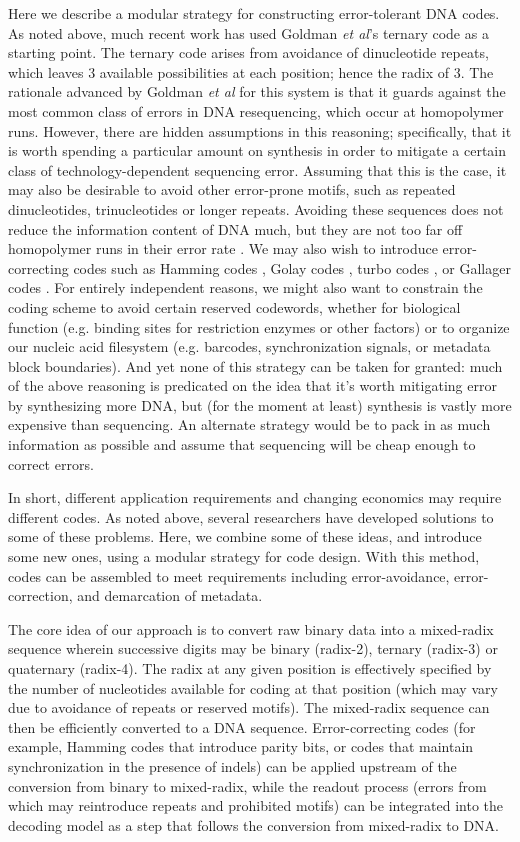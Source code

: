 \documentclass[english]{article}
\begin{document}
Here we describe a modular strategy for constructing error-tolerant DNA codes.
As noted above, much recent work has used Goldman {\em et al}'s ternary code as a starting point.
The ternary code arises from avoidance of dinucleotide repeats, which leaves 3 available possibilities at each position; hence the radix of 3.
The rationale advanced by Goldman {\em et al} for this system is that it guards against the most common class of errors in DNA resequencing, which occur at homopolymer runs.
However, there are hidden assumptions in this reasoning; specifically, that it is worth spending a particular amount on synthesis
in order to mitigate a certain class of technology-dependent sequencing error.
Assuming that this is the case, it may also be desirable to avoid other error-prone motifs, such as repeated dinucleotides, trinucleotides or longer repeats.
Avoiding these sequences does not reduce the information content of DNA much, but they are not too far off homopolymer runs in their error rate \cite{LaehnemannEtAl2016}.
We may also wish to introduce error-correcting codes such as Hamming codes \cite{Mackay2003}, Golay codes \cite{GuptaEtAl2015},
turbo codes \cite{FreyMackay98,MurphyEtAl1999}, or Gallager codes \cite{Mackay1997}.
For entirely independent reasons, we might also want to constrain the coding scheme to avoid certain reserved codewords,
whether for biological function (e.g. binding sites for restriction enzymes or other factors)
or to organize our nucleic acid filesystem (e.g. barcodes, synchronization signals, or metadata block boundaries).
And yet none of this strategy can be taken for granted:
much of the above reasoning is predicated on the idea that it's worth mitigating error by synthesizing more DNA,
but (for the moment at least) synthesis is vastly more expensive than sequencing.
An alternate strategy would be to pack in as much information as possible and assume that sequencing will be cheap enough to correct errors.

In short, different application requirements and changing economics may require different codes.
As noted above, several researchers have developed solutions to some of these problems.
Here, we combine some of these ideas, and introduce some new ones, using a modular strategy for code design.
With this method, codes can be assembled to meet requirements
including error-avoidance, error-correction, and demarcation of metadata.

The core idea of our approach is to convert raw binary data into a mixed-radix sequence
wherein successive digits may be binary (radix-2), ternary (radix-3) or quaternary (radix-4).
The radix at any given position is effectively specified by the number of nucleotides available for coding at that position
(which may vary due to avoidance of repeats or reserved motifs).
The mixed-radix sequence can then be efficiently converted to a DNA sequence.
Error-correcting codes (for example, Hamming codes that introduce parity bits, or codes that maintain synchronization in the presence of indels)
can be applied upstream of the conversion from binary to mixed-radix,
while the readout process (errors from which may reintroduce repeats and prohibited motifs)
can be integrated into the decoding model as a step that follows the conversion from mixed-radix to DNA.
\end{document}

